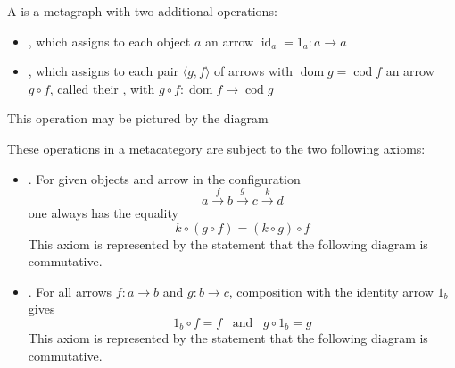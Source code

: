 \documentclass{mathnotes}
\DeclareMathOperator{\dom}{dom}
\DeclareMathOperator{\cod}{cod}
\DeclareMathOperator{\id}{id}
\begin{document}
\begin{defi}
  A  is a metagraph with two additional operations:
  \begin{itemize}
    \item {}, which assigns to each object $a$ an arrow
      $\id_a=1_a:a\rightarrow a$
    \item {}, which assigns to each pair $\langle g,f
      \rangle$ of arrows with $\dom g=\cod f$ an arrow $g\circ f$, called their
      , with $g\circ f:\dom f\rightarrow\cod g$
  \end{itemize}
  This operation may be pictured by the diagram
  \begin{center}
  \end{center}
  These operations in a metacategory are subject to the two following axioms:
  \begin{itemize}
    \item {}. For given objects and arrow in the
      configuration
      \[a\xrightarrow{f}b\xrightarrow{g}c\xrightarrow{k}d\]
      one always has the equality
      \[k\circ\left(g\circ f\right)=\left(k\circ g\right)\circ f\]
      This axiom is represented by the statement that the following diagram is
      commutative.
      \begin{center}
      \end{center}
    \item {}. For all arrows $f:a\rightarrow b$ and
      $g:b\rightarrow c$, composition with the identity arrow $1_b$ gives
      \[1_b\circ f=f\hspace{10pt}\text{and}\hspace{10pt}g\circ1_b=g\]
      This axiom is represented by the statement that the following diagram is
      commutative.
      \begin{center}
      \end{center}
  \end{itemize}
\end{defi}
\end{document}
